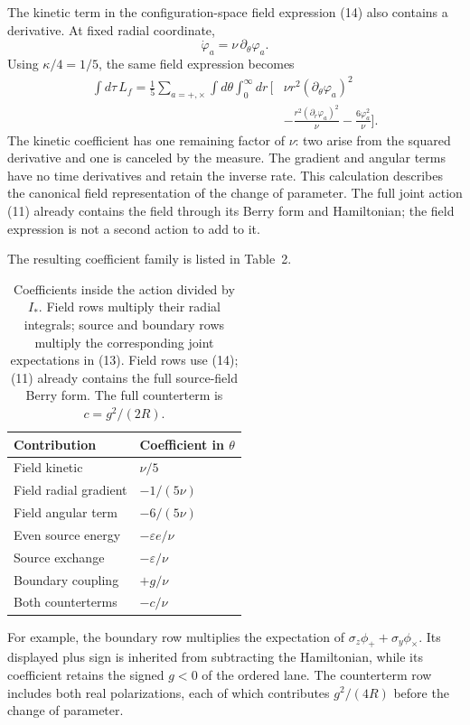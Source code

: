 \documentclass[10pt,twocolumn,letterpaper]{article}
\begin{document}
The kinetic term in the configuration-space field expression (14) also contains a derivative. At fixed radial coordinate,
\[
\dot\varphi_a=\nu\,\partial_\theta\varphi_a.
\]
Using $\kappa/4=1/5$, the same field expression becomes
\[
\begin{aligned}
\int d\tau\,L_f
=\frac15\sum_{a=+,\times}\int d\theta\int_0^\infty dr\,
\biggl[&\nu r^2(\partial_\theta\varphi_a)^2\\
&-\frac{r^2(\partial_r\varphi_a)^2}{\nu}
-\frac{6\varphi_a^2}{\nu}\biggr].
\end{aligned}
\]
The kinetic coefficient has one remaining factor of $\nu$: two arise from the squared derivative and one is canceled by the measure. The gradient and angular terms have no time derivatives and retain the inverse rate. This calculation describes the canonical field representation of the change of parameter. The full joint action (11) already contains the field through its Berry form and Hamiltonian; the field expression is not a second action to add to it.

The resulting coefficient family is listed in Table~2.
\begin{table}[tbp]
\centering
\small
\begin{tabular*}{\columnwidth}{@{\extracolsep{\fill}}ll@{}}
\toprule
Contribution & Coefficient in $\theta$ \\
\midrule
Field kinetic & $\nu/5$ \\
Field radial gradient & $-1/(5\nu)$ \\
Field angular term & $-6/(5\nu)$ \\
Even source energy & $-\varepsilon e/\nu$ \\
Source exchange & $-\varepsilon/\nu$ \\
Boundary coupling & $+g/\nu$ \\
Both counterterms & $-c/\nu$ \\
\bottomrule
\end{tabular*}
\caption{Coefficients inside the action divided by $I_*$. Field rows multiply their radial integrals; source and boundary rows multiply the corresponding joint expectations in (13). Field rows use (14); (11) already contains the full source-field Berry form. The full counterterm is $c=g^2/(2R)$.}
\end{table}
For example, the boundary row multiplies the expectation of $\sigma_z\phi_++\sigma_y\phi_\times$. Its displayed plus sign is inherited from subtracting the Hamiltonian, while its coefficient retains the signed $g<0$ of the ordered lane. The counterterm row includes both real polarizations, each of which contributes $g^2/(4R)$ before the change of parameter.
\end{document}
